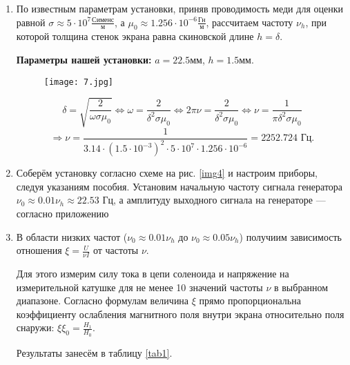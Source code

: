 \documentclass[a4paper,12pt]{article} %
\begin{document}
\begin{enumerate}
    \item По известным параметрам установки, приняв проводимость меди для оценки равной $\sigma \approx 5 \cdot 10^7 \frac{\text{Сименс}}{\text{м}}$, а $\mu_0 \approx 1.256 \cdot 10^{-6} \frac{\text{Гн}}{\text{м}}$, рассчитаем частоту $\nu_{h}$, при которой толщина стенок экрана равна скиновской длине $h = \delta$.

    \textbf{Параметры нашей установки:} $a = 22.5 \text{мм}$,  $h = 1.5 \text{мм}$.

    \begin{figure}[!h]
        \centering
        \texttt{[image: 7.jpg]}
        \label{graf1}
    \end{figure}

    \[ \delta = \sqrt{\frac{2}{\omega \sigma \mu_0}} \Leftrightarrow \omega = \frac{2}{\delta^2 \sigma \mu_0} \Leftrightarrow 2 \pi \nu = \frac{2}{\delta^2 \sigma \mu_0} \Leftrightarrow \nu = \frac{1}{\pi \delta^2 \sigma \mu_0} \] \[ \Rightarrow \nu = \frac{1}{3.14 \cdot (1.5 \cdot 10^{-3})^2 \cdot 5 \cdot 10^7 \cdot 1.256 \cdot 10^{-6}} = 2252.724 \text{ Гц}. \]

    \item Соберём установку согласно схеме на рис. \ref{img4} и настроим приборы, следуя указаниям пособия. Установим начальную частоту сигнала генератора $\nu_0 \approx 0.01 \nu_{h} \approx 22.53 \text{ Гц}$, а амплитуду выходного сигнала на генераторе — согласно приложению
    
    \item В области низких частот ($\nu_0 \approx 0.01 \nu_{h}$ до $\nu_0 \approx 0.05 \nu_{h}$) получиим зависимость отношения
    $\xi = \frac{U}{\nu I}$ от частоты $\nu$.
    
    Для этого измерим силу тока в цепи соленоида и напряжение на измерительной катушке для не менее 10 значений частоты $\nu$ в выбранном диапазоне. Согласно формулам величина $\xi$ прямо пропорциональна коэффициенту ослабления магнитного поля внутри экрана относительно поля снаружи: $\xi\xi_0 = \frac{H_1}{H_0}.$

    Результаты занесём в таблицу \ref{tab1}.


\end{enumerate}
\end{document}
